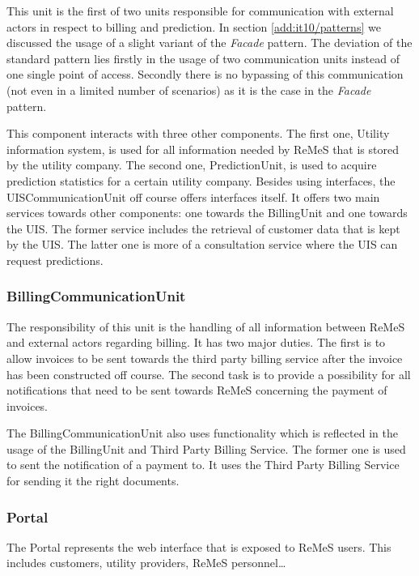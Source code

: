 \npar This unit is the first of two units responsible for communication with
external actors in respect to billing and prediction. In section
\ref{add:it10/patterns} we discussed the usage of a slight variant of the
\emph{Facade} pattern. The deviation of the standard pattern lies firstly in the
usage of two communication units instead of one single point of access.
Secondly there is no bypassing of this communication (not even in a limited
number of scenarios) as it is the case in the \emph{Facade} pattern.

\npar This component interacts with three other components. The first one,
Utility information system, is used for all information needed by ReMeS that is
stored by the utility company. The second one, PredictionUnit, is used to
acquire prediction statistics for a certain utility company. Besides using
interfaces, the UISCommunicationUnit off course offers interfaces itself. It
offers two main services towards other components: one towards the BillingUnit
and one towards the UIS. The former service includes the retrieval of customer
data that is kept by the UIS. The latter one is more of a consultation service
where the UIS can request predictions.

\subsubsection{BillingCommunicationUnit}

\npar The responsibility of this unit is the handling of all information between
ReMeS and external actors regarding billing. It has two major duties. The first
is to allow invoices to be sent towards the third party billing service after
the invoice has been constructed off course. The second task is to provide a
possibility for all notifications that need to be sent towards ReMeS concerning
the payment of invoices.

\npar The BillingCommunicationUnit also uses functionality which is reflected in
the usage of the BillingUnit and Third Party Billing Service. The former one is
used to sent the notification of a payment to. It uses the Third Party Billing
Service for sending it the right documents.

\subsubsection{Portal}

\npar The Portal represents the web interface that is exposed to ReMeS users.
This includes customers, utility providers, ReMeS personnel\ldots

